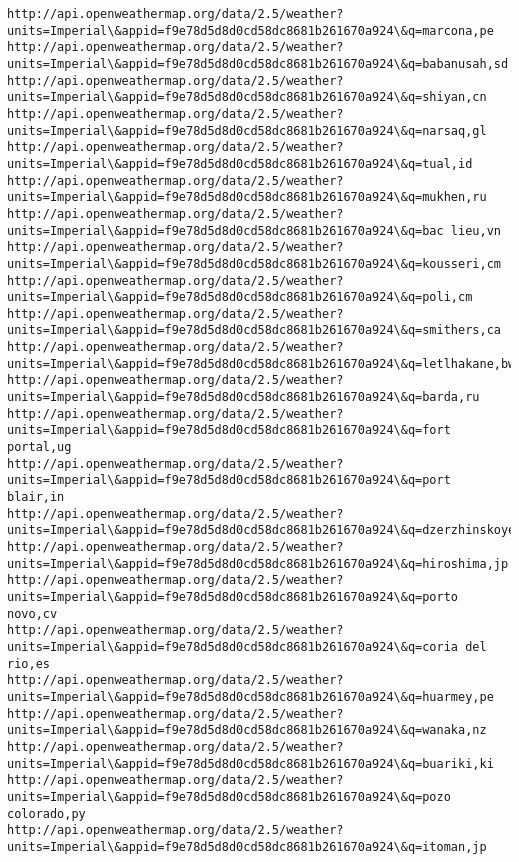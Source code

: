 \documentclass[11pt]{article}
\begin{document}
\begin{Verbatim}[commandchars=\\\{\}]
http://api.openweathermap.org/data/2.5/weather?units=Imperial\&appid=f9e78d5d8d0cd58dc8681b261670a924\&q=marcona,pe
http://api.openweathermap.org/data/2.5/weather?units=Imperial\&appid=f9e78d5d8d0cd58dc8681b261670a924\&q=babanusah,sd
http://api.openweathermap.org/data/2.5/weather?units=Imperial\&appid=f9e78d5d8d0cd58dc8681b261670a924\&q=shiyan,cn
http://api.openweathermap.org/data/2.5/weather?units=Imperial\&appid=f9e78d5d8d0cd58dc8681b261670a924\&q=narsaq,gl
http://api.openweathermap.org/data/2.5/weather?units=Imperial\&appid=f9e78d5d8d0cd58dc8681b261670a924\&q=tual,id
http://api.openweathermap.org/data/2.5/weather?units=Imperial\&appid=f9e78d5d8d0cd58dc8681b261670a924\&q=mukhen,ru
http://api.openweathermap.org/data/2.5/weather?units=Imperial\&appid=f9e78d5d8d0cd58dc8681b261670a924\&q=bac lieu,vn
http://api.openweathermap.org/data/2.5/weather?units=Imperial\&appid=f9e78d5d8d0cd58dc8681b261670a924\&q=kousseri,cm
http://api.openweathermap.org/data/2.5/weather?units=Imperial\&appid=f9e78d5d8d0cd58dc8681b261670a924\&q=poli,cm
http://api.openweathermap.org/data/2.5/weather?units=Imperial\&appid=f9e78d5d8d0cd58dc8681b261670a924\&q=smithers,ca
http://api.openweathermap.org/data/2.5/weather?units=Imperial\&appid=f9e78d5d8d0cd58dc8681b261670a924\&q=letlhakane,bw
http://api.openweathermap.org/data/2.5/weather?units=Imperial\&appid=f9e78d5d8d0cd58dc8681b261670a924\&q=barda,ru
http://api.openweathermap.org/data/2.5/weather?units=Imperial\&appid=f9e78d5d8d0cd58dc8681b261670a924\&q=fort portal,ug
http://api.openweathermap.org/data/2.5/weather?units=Imperial\&appid=f9e78d5d8d0cd58dc8681b261670a924\&q=port blair,in
http://api.openweathermap.org/data/2.5/weather?units=Imperial\&appid=f9e78d5d8d0cd58dc8681b261670a924\&q=dzerzhinskoye,ru
http://api.openweathermap.org/data/2.5/weather?units=Imperial\&appid=f9e78d5d8d0cd58dc8681b261670a924\&q=hiroshima,jp
http://api.openweathermap.org/data/2.5/weather?units=Imperial\&appid=f9e78d5d8d0cd58dc8681b261670a924\&q=porto novo,cv
http://api.openweathermap.org/data/2.5/weather?units=Imperial\&appid=f9e78d5d8d0cd58dc8681b261670a924\&q=coria del rio,es
http://api.openweathermap.org/data/2.5/weather?units=Imperial\&appid=f9e78d5d8d0cd58dc8681b261670a924\&q=huarmey,pe
http://api.openweathermap.org/data/2.5/weather?units=Imperial\&appid=f9e78d5d8d0cd58dc8681b261670a924\&q=wanaka,nz
http://api.openweathermap.org/data/2.5/weather?units=Imperial\&appid=f9e78d5d8d0cd58dc8681b261670a924\&q=buariki,ki
http://api.openweathermap.org/data/2.5/weather?units=Imperial\&appid=f9e78d5d8d0cd58dc8681b261670a924\&q=pozo colorado,py
http://api.openweathermap.org/data/2.5/weather?units=Imperial\&appid=f9e78d5d8d0cd58dc8681b261670a924\&q=itoman,jp

\end{Verbatim}
\end{document}
